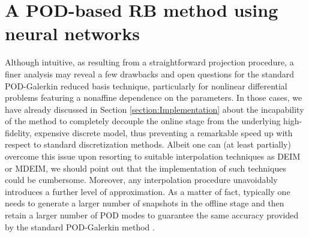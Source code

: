 \documentclass[12pt, a4paper, twoside, openright]{report}
\numberwithin{equation}{chapter}
\theoremstyle{theorem}
\theoremstyle{definition}
\theoremstyle{remark}
\theoremstyle{proposition}
\numberwithin{figure}{chapter}
\begin{document}
	\vspace*{0.3cm}	
		
	\section{A POD-based RB method using neural networks}
	\label{section:A POD-based RB method using neural networks}
							
		Although intuitive, as resulting from a straightforward projection procedure, a finer analysis may reveal a few drawbacks and open questions for the standard POD-Galerkin reduced basis technique, particularly for nonlinear differential problems featuring a nonaffine dependence on the parameters. In those cases, we have already discussed in Section \ref{section:Implementation} about the incapability of the method to completely decouple the online stage from the underlying high-fidelity, expensive discrete model, thus preventing a remarkable speed up with respect to standard discretization methods. Albeit one can (at least partially) overcome this issue upon resorting to suitable interpolation techniques as DEIM or MDEIM, we should point out that the implementation of such techniques could be cumbersome. Moreover, any interpolation procedure unavoidably introduces a further level of approximation. As a matter of fact, typically one needs to generate a larger number of snapshots in the offline stage and then retain a larger number of POD modes to guarantee the same accuracy provided by the standard POD-Galerkin method \cite{Bar04}.
		
\end{document}
